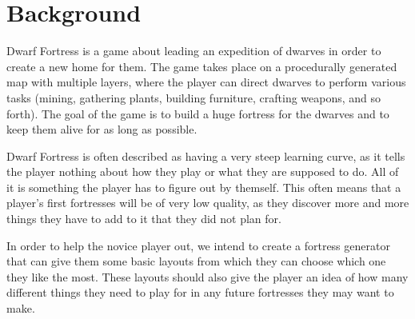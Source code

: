 \section{Background}
\label{02}

Dwarf Fortress is a game about leading an expedition of dwarves in order to create a new home for them. The game takes place on a procedurally generated map with multiple layers, where the player can direct dwarves to perform various tasks (mining, gathering plants, building furniture, crafting weapons, and so forth). The goal of the game is to build a huge fortress for the dwarves and to keep them alive for as long as possible.

Dwarf Fortress is often described as having a very steep learning curve, as it tells the player nothing about how they play or what they are supposed to do. All of it is something the player has to figure out by themself. This often means that a player's first fortresses will be of very low quality, as they discover more and more things they have to add to it that they did not plan for.

In order to help the novice player out, we intend to create a fortress generator that can give them some basic layouts from which they can choose which one they like the most. These layouts should also give the player an idea of how many different things they need to play for in any future fortresses they may want to make.





